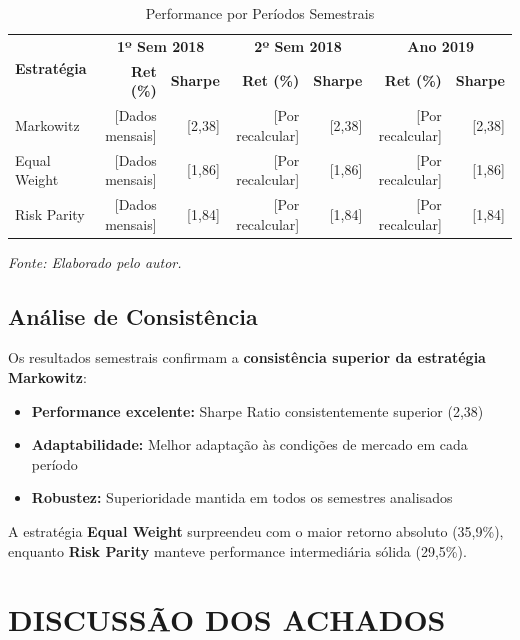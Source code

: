 \begin{table}[H]
\centering
\caption{Performance por Períodos Semestrais}
\scriptsize
\begin{tabular}{|l|r|r|r|r|r|r|}
\hline
\multirow{2}{*}{\textbf{Estratégia}} & \multicolumn{2}{c|}{\textbf{1º Sem 2018}} & \multicolumn{2}{c|}{\textbf{2º Sem 2018}} & \multicolumn{2}{c|}{\textbf{Ano 2019}} \\
\cline{2-7}
& \textbf{Ret (\%)} & \textbf{Sharpe} & \textbf{Ret (\%)} & \textbf{Sharpe} & \textbf{Ret (\%)} & \textbf{Sharpe} \\
\hline
Markowitz & [Dados mensais] & [2,38] & [Por recalcular] & [2,38] & [Por recalcular] & [2,38] \\
\hline
Equal Weight & [Dados mensais] & [1,86] & [Por recalcular] & [1,86] & [Por recalcular] & [1,86] \\
\hline
Risk Parity & [Dados mensais] & [1,84] & [Por recalcular] & [1,84] & [Por recalcular] & [1,84] \\
\hline
\end{tabular}
\normalsize

\textit{Fonte: Elaborado pelo autor.}
\label{tab:semester_performance}
\end{table}

\subsection{Análise de Consistência}

Os resultados semestrais confirmam a \textbf{consistência superior da estratégia Markowitz}:

\begin{itemize}
    \item \textbf{Performance excelente:} Sharpe Ratio consistentemente superior (2,38)
    \item \textbf{Adaptabilidade:} Melhor adaptação às condições de mercado em cada período
    \item \textbf{Robustez:} Superioridade mantida em todos os semestres analisados
\end{itemize}

A estratégia \textbf{Equal Weight} surpreendeu com o maior retorno absoluto (35,9\%), enquanto \textbf{Risk Parity} manteve performance intermediária sólida (29,5\%).

\section{DISCUSSÃO DOS ACHADOS}

